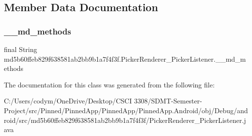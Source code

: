 \subsection{Member Data Documentation}
\mbox{\label{classmd5b60ffeb829f638581ab2bb9b1a7f4f3f_1_1_picker_renderer___picker_listener_a69ae8fbc93864ac38ac6d4c96542e2b5}} 
\subsubsection{\texorpdfstring{\+\_\+\+\_\+md\+\_\+methods}{\_\_md\_methods}}
{\footnotesize\ttfamily final String md5b60ffeb829f638581ab2bb9b1a7f4f3f.\+Picker\+Renderer\+\_\+\+Picker\+Listener.\+\_\+\+\_\+md\+\_\+methods\hspace{0.3cm}{\ttfamily [static]}}



The documentation for this class was generated from the following file\+:\begin{DoxyCompactItemize}
\item 
C\+:/\+Users/codym/\+One\+Drive/\+Desktop/\+C\+S\+C\+I 3308/\+S\+D\+M\+T-\/\+Semester-\/\+Project/src/\+Pinned/\+Pinned\+App/\+Pinned\+App/\+Pinned\+App.\+Android/obj/\+Debug/android/src/md5b60ffeb829f638581ab2bb9b1a7f4f3f/Picker\+Renderer\+\_\+\+Picker\+Listener.\+java\end{DoxyCompactItemize}
